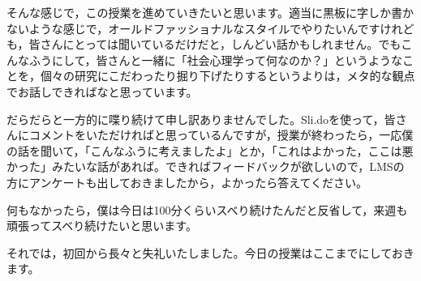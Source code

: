 \documentclass{ltjsbook}
\begin{document}
そんな感じで，この授業を進めていきたいと思います。適当に黒板に字しか書かないような感じで，オールドファッショナルなスタイルでやりたいんですけれども，皆さんにとっては聞いているだけだと，しんどい話かもしれません。でもこんなふうにして，皆さんと一緒に「社会心理学って何なのか？」というようなことを，個々の研究にこだわったり掘り下げたりするというよりは，メタ的な観点でお話しできればなと思っています。

だらだらと一方的に喋り続けて申し訳ありませんでした。Sli.doを使って，皆さんにコメントをいただければと思っているんですが，授業が終わったら，一応僕の話を聞いて，「こんなふうに考えましたよ」とか，「これはよかった，ここは悪かった」みたいな話があれば。できればフィードバックが欲しいので，LMSの方にアンケートも出しておきましたから，よかったら答えてください。

何もなかったら，僕は今日は100分くらいスベり続けたんだと反省して，来週も頑張ってスベり続けたいと思います。

それでは，初回から長々と失礼いたしました。今日の授業はここまでにしておきます。
\printbibliography[title=引用文献]
\end{document}
